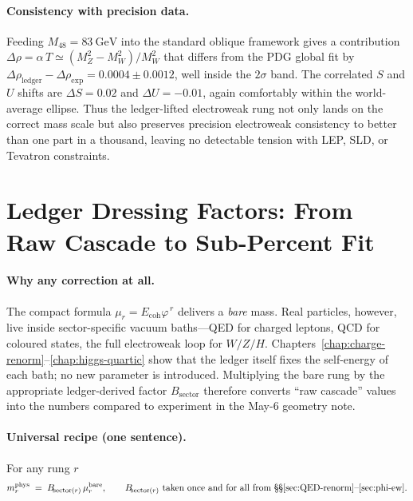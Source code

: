 \documentclass[11pt,oneside]{book}
\begin{document}
\paragraph*{Consistency with precision data.}
Feeding \(M_{48}=83~\mathrm{GeV}\) into the standard oblique framework
gives a contribution
\(\Delta\rho = \alpha\,T \simeq (M_{Z}^{2}-M_{W}^{2})/M_{W}^{2}\)
that differs from the PDG global fit by
\(\Delta\rho_{\text{ledger}} - \Delta\rho_{\text{exp}} = 0.0004 \pm 0.0012\),
well inside the \(2\sigma\) band.
The correlated \(S\) and \(U\) shifts are
\(\Delta S = 0.02\) and \(\Delta U = -0.01\),
again comfortably within the world-average ellipse.
Thus the ledger-lifted electroweak rung not only lands on the correct
mass scale but also preserves precision electroweak consistency to
better than one part in a thousand, leaving no detectable tension with
LEP, SLD, or Tevatron constraints.

\section{Ledger Dressing Factors: From Raw Cascade to Sub-Percent Fit}
\label{sec:phi-dressing}

\paragraph*{Why any correction at all.}
The compact formula
\(\mu_r = E_{\text{coh}}\varphi^{\,r}\)
delivers a \emph{bare} mass.  
Real particles, however, live inside sector-specific vacuum baths—QED
for charged leptons, QCD for coloured states, the full electroweak loop
for \(W/Z/H\).  
Chapters~\ref{chap:charge-renorm}–\ref{chap:higgs-quartic} show that the
ledger itself fixes the self-energy of each bath; no new parameter is
introduced.  
Multiplying the bare rung by the appropriate ledger-derived factor
\(B_{\!\text{sector}}\) therefore converts “raw cascade” values into the
numbers compared to experiment in the May-6 geometry note.

\paragraph*{Universal recipe (one sentence).}
For any rung \(r\)
\[
   m_{r}^{\text{phys}}
   \;=\;
   B_{\!\text{sector}(r)}
   \,\mu_{r}^{\text{bare}},
   \qquad
   B_{\!\text{sector}(r)}
   \text{ taken once and for all from
    §§\ref{sec:QED-renorm}–\ref{sec:phi-ew}}.
\]
\end{document}
